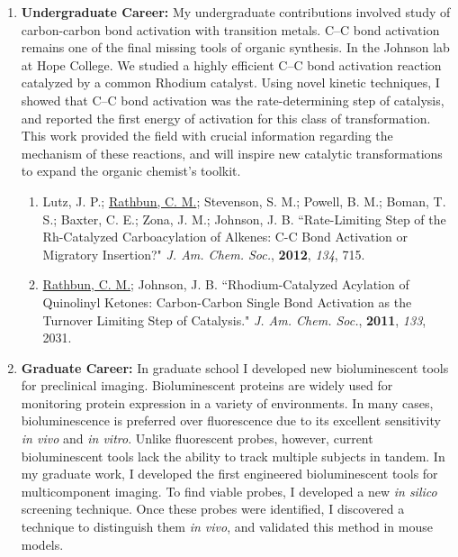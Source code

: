 \documentclass{nihbiosketch}
\begin{document}
\begin{enumerate}

\item \textbf{Undergraduate Career:} My undergraduate contributions involved study of carbon-carbon bond activation with transition metals. C--C bond activation remains one of the final missing tools of organic synthesis. In the Johnson lab at Hope College. We studied a highly efficient C--C bond activation reaction catalyzed by a common Rhodium catalyst. Using novel kinetic techniques, I showed that C--C bond activation was the rate-determining step of catalysis, and reported the first energy of activation for this class of transformation. This work provided the field with crucial information regarding the mechanism of these reactions, and will inspire new catalytic transformations to expand the organic chemist's toolkit.

\begin{enumerate}

  \item Lutz, J. P.; \underline{Rathbun, C. M.}; Stevenson, S. M.; Powell, B. M.; Boman, T. S.; Baxter, C. E.; Zona, J. M.; Johnson, J. B. ``Rate-Limiting Step of the Rh-Catalyzed Carboacylation of Alkenes: C-C Bond Activation or Migratory Insertion?" \textit{J. Am. Chem. Soc.}, \textbf{2012}, \textit{134}, 715.

  \item \underline{Rathbun, C. M.}; Johnson, J. B. ``Rhodium-Catalyzed Acylation of Quinolinyl Ketones: Carbon-Carbon Single Bond Activation as the Turnover Limiting Step of Catalysis." \textit{J. Am. Chem. Soc.}, \textbf{2011}, \textit{133}, 2031.

\end{enumerate}


\item \textbf{Graduate Career:} In graduate school I developed new bioluminescent tools for preclinical imaging. Bioluminescent proteins are widely used for monitoring protein expression in a variety of environments. In many cases, bioluminescence is preferred over fluorescence due to its excellent sensitivity \textit{in vivo} and \textit{in vitro}. Unlike fluorescent probes, however, current bioluminescent tools lack the ability to track multiple subjects in tandem. In my graduate work, I developed the first engineered bioluminescent tools for multicomponent imaging. To find viable probes, I developed a new \textit{in silico} screening technique. Once these probes were identified, I discovered a technique to distinguish them \textit{in vivo}, and validated this method in mouse models.


\end{enumerate}
\end{document}
